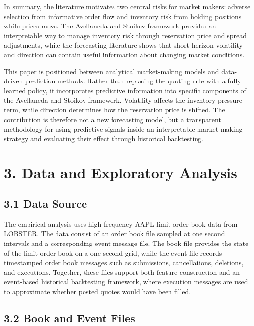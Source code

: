 \documentclass[12pt,a4paper]{article}
\let\originalsection\section
\renewcommand{\section}{\clearpage\originalsection}
\begin{document}
In summary, the literature motivates two central risks for market
makers: adverse selection from informative order flow and inventory risk
from holding positions while prices move. The Avellaneda and Stoikov
framework provides an interpretable way to manage inventory risk through
reservation price and spread adjustments, while the forecasting
literature shows that short-horizon volatility and direction can contain
useful information about changing market conditions.

This paper is positioned between analytical market-making models and
data-driven prediction methods. Rather than replacing the quoting rule
with a fully learned policy, it incorporates predictive information into
specific components of the Avellaneda and Stoikov framework. Volatility
affects the inventory pressure term, while direction determines how the
reservation price is shifted. The contribution is therefore not a new
forecasting model, but a transparent methodology for using predictive
signals inside an interpretable market-making strategy and evaluating
their effect through historical backtesting.

\section{3. Data and Exploratory
Analysis}\label{data-and-exploratory-analysis}

\subsection{3.1 Data Source}\label{data-source}

The empirical analysis uses high-frequency AAPL limit order book data
from LOBSTER. The data consist of an order book file sampled at one
second intervals and a corresponding event message file. The book file
provides the state of the limit order book on a one second grid, while
the event file records timestamped order book messages such as
submissions, cancellations, deletions, and executions. Together, these
files support both feature construction and an event-based historical
backtesting framework, where execution messages are used to approximate
whether posted quotes would have been filled.

\subsection{3.2 Book and Event Files}\label{book-and-event-files}
\end{document}
